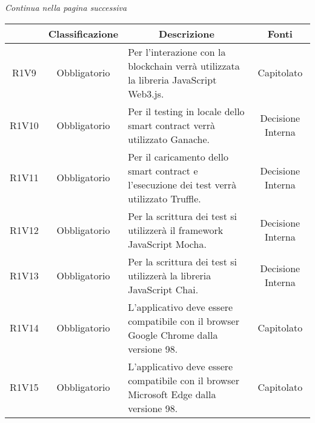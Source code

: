 \begin{center}
    \textit{\small Continua nella pagina successiva}
\end{center}
\begin{table}[H]
    \centering
    \renewcommand{\arraystretch}{1.8}
    \begin{tabular}{c | c | p{6cm} | c}
        \rowcolor[HTML]{125E28}
        \multicolumn{1}{c}{\color[HTML]{FFFFFF} \textbf{Codice}}          &
        \multicolumn{1}{c}{\color[HTML]{FFFFFF} \textbf{Classificazione}} &
        \multicolumn{1}{c}{\color[HTML]{FFFFFF} \textbf{Descrizione}}     &
        \multicolumn{1}{c}{\color[HTML]{FFFFFF} \textbf{Fonti}}                                                                                                                                                       \\
        \hline
        R1V9                                                              & Obbligatorio & Per l'interazione con la blockchain\glo{} verrà utilizzata la libreria JavaScript\glo{} Web3.js\glo{}. & Capitolato        \\
        R1V10                                                             & Obbligatorio & Per il testing in locale dello smart contract\glo{} verrà utilizzato Ganache\glo{}.                    & Decisione Interna \\
        R1V11                                                             & Obbligatorio & Per il caricamento dello smart contract\glo{} e l'esecuzione dei test verrà utilizzato Truffle\glo{}.  & Decisione Interna \\
        R1V12                                                             & Obbligatorio & Per la scrittura dei test si utilizzerà il framework\glo{} JavaScript\glo{} Mocha\glo{}.               & Decisione Interna \\
        R1V13                                                             & Obbligatorio & Per la scrittura dei test si utilizzerà la libreria JavaScript\glo{} Chai\glo{}.                       & Decisione Interna \\
        R1V14                                                             & Obbligatorio & L'applicativo deve essere compatibile con il browser Google Chrome\glo{} dalla versione 98.            & Capitolato        \\
        R1V15                                                             & Obbligatorio & L'applicativo deve essere compatibile con il browser Microsoft Edge\glo{} dalla versione 98.           & Capitolato        \\

\end{tabular}
\end{table}
